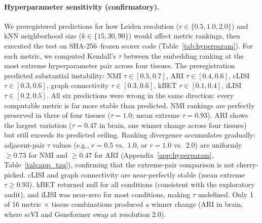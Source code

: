\documentclass[10pt,letterpaper]{article}
\begin{document}
\paragraph{Hyperparameter sensitivity (confirmatory).} We preregistered predictions for how Leiden resolution ($r \in \{0.5, 1.0, 2.0\}$) and kNN neighborhood size ($k \in \{15, 30, 90\}$) would affect metric rankings, then executed the test on SHA-256--frozen scorer code (Table~\ref{tab:hyperparam}). For each metric, we computed Kendall's $\tau$ between the embedding ranking at the most extreme hyperparameter pair across four tissues. The preregistration predicted substantial instability: NMI $\tau \in [0.5, 0.7]$, ARI $\tau \in [0.4, 0.6]$, cLISI $\tau \in [0.3, 0.6]$, graph connectivity $\tau \in [0.3, 0.6]$, kBET $\tau \in [0.1, 0.4]$, iLISI $\tau \in [0.2, 0.5]$. All six predictions were wrong in the same direction: every computable metric is far more stable than predicted. NMI rankings are perfectly preserved in three of four tissues ($\tau = 1.0$; mean extreme $\tau = 0.93$). ARI shows the largest variation ($\tau = 0.47$ in brain, one winner change across four tissues) but still exceeds its predicted ceiling. Ranking divergence accumulates gradually: adjacent-pair $\tau$ values (e.g., $r = 0.5$ vs.\ $1.0$, or $r = 1.0$ vs.\ $2.0$) are uniformly $\geq 0.73$ for NMI and $\geq 0.47$ for ARI (Appendix~\ref{app:hyperparam}, Table~\ref{tab:app_tau}), confirming that the extreme-pair comparison is not cherry-picked. cLISI and graph connectivity are near-perfectly stable (mean extreme $\tau \geq 0.93$). kBET returned null for all conditions (consistent with the exploratory audit), and iLISI was near-zero for most conditions, making $\tau$ undefined. Only 1 of 16 metric $\times$ tissue combinations produced a winner change (ARI in brain, where scVI and Geneformer swap at resolution 2.0).
\end{document}
